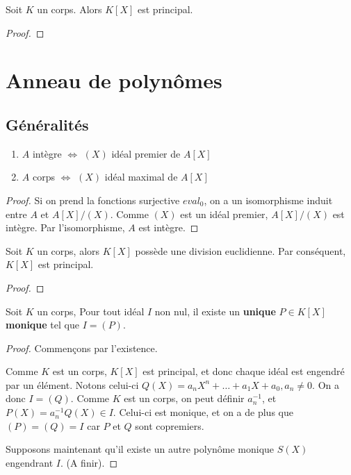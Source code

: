 \begin{proposition}
	Soit $K$ un corps. Alors $K[X]$ est principal.
\end{proposition}

\ifdefined\outputproof
\begin{proof}

\end{proof}
\fi


\section{Anneau de polynômes}

\subsection{Généralités}

\begin{proposition}
	\begin{enumerate}
		\item $A$ intègre $\Leftrightarrow$ $(X)$ idéal premier de $A[X]$
		\item $A$ corps $\Leftrightarrow$ $(X)$ idéal maximal de $A[X]$
	\end{enumerate}
\end{proposition}

\ifdefined\outputproof
\begin{proof}
	Si on prend la fonctions surjective $eval_{0}$, on a un isomorphisme induit
	entre $A$ et $A[X]/(X)$. Comme $(X)$ est un idéal premier, $A[X]/(X)$ est
	intègre. Par l'isomorphisme, $A$ est intègre.
\end{proof}
\fi

\begin{proposition}
	Soit $K$ un corps, alors $K[X]$ possède une division euclidienne. Par
	conséquent, $K[X]$ est principal.
\end{proposition}

\ifdefined\outputproof
\begin{proof}
\end{proof}
\fi

\begin{proposition}
	Soit $K$ un corps,
	Pour tout idéal $I$ non nul, il existe un \textbf{unique} $P \in K[X]$
	\textbf{monique} tel que $I = (P)$.
\end{proposition}

\ifdefined\outputproof
\begin{proof}
	Commençons par l'existence.

	Comme $K$ est un corps, $K[X]$ est principal, et donc chaque idéal est
	engendré par un élément. Notons celui-ci $Q(X) = a_{n}X^{n} + \ldots +
	a_{1}X + a_{0}, a_{n} \ne 0$. On a donc $I = (Q)$. Comme $K$ est un corps, on peut
	définir $a_{n}^{-1}$, et $P(X) = a_{n}^{-1}Q(X) \in I$. Celui-ci est
	monique, et on a de plus que $(P) = (Q) = I$ car $P$ et $Q$ sont copremiers.

	Supposons maintenant qu'il existe un autre polynôme monique $S(X)$
	engendrant $I$. (A finir).
\end{proof}
\fi

